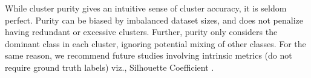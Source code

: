\documentclass[12pt,a4paper]{article}
\begin{document}
While cluster purity gives an intuitive sense of cluster accuracy, it is seldom perfect. Purity can be biased by imbalanced dataset sizes, and does not penalize having redundant or excessive clusters. Further, purity only considers the dominant class in each cluster, ignoring potential mixing of other classes. For the same reason, we recommend future studies involving
intrinsic metrics (do not require ground truth labels) viz., Silhouette Coefficient \cite{silhouettecoefficient}.




\end{document}
